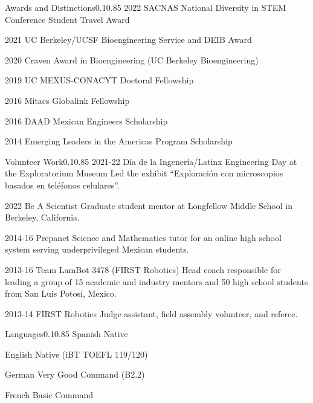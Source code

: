 \documentclass{federico_cv}
\begin{document}
\begin{tblSection}{Awards and Distinctions}{0.1}{0.85}
\award
{2022}
{SACNAS National Diversity in STEM Conference Student Travel Award}

\award
{2021}
{UC Berkeley/UCSF Bioengineering Service and DEIB Award}

\award
{2020}
{Craven Award in Bioengineering (UC Berkeley Bioengineering)}

\award
{2019}
{UC MEXUS-CONACYT Doctoral Fellowship}

\award
{2016}
{Mitacs Globalink Fellowship}

\award
{2016}
{DAAD Mexican Engineers Scholarship}

\award
{2014}
{Emerging Leaders in the Americas Program Scholarship}

\end{tblSection}


\begin{tblSection}{Volunteer Work}{0.1}{0.85}
\job
{2021-22}
{Día de la Ingenería/Latinx Engineering Day at the Exploratorium Museum}
{Led the exhibit ``Exploración con microscopios basados en teléfonos celulares''.}

\leftbfrightsinglenobreak
{2022}
{Be A Scientist}
{Graduate student mentor at Longfellow Middle School in Berkeley, California.}

\job
{2014-16}
{Prepanet}
{Science and Mathematics tutor for an online high school system serving underprivileged Mexican students.}

\job
{2013-16}
{Team LamBot 3478 (FIRST Robotics)}
{Head coach responsible for leading a group of 15 academic and industry mentors and 50 high school students from San Luis Potosí, Mexico.}

\job
{2013-14}
{FIRST Robotics}
{Judge assistant, field assembly volunteer, and referee.}

\end{tblSection}


\begin{tblSection}{Languages}{0.1}{0.85}
\leftrightsingletight
{Spanish}
{Native}

\leftrightsingletight
{English}
{Native (iBT TOEFL 119/120)}

\leftrightsingletight
{German}
{Very Good Command (B2.2)}

\leftrightsingletight
{French}
{Basic Command}

\end{tblSection}
\end{document}
